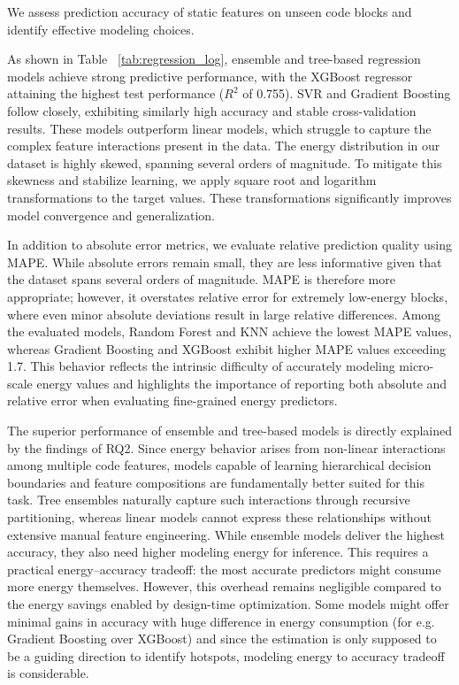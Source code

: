 
We assess prediction accuracy of static features on unseen code blocks and identify effective modeling choices.

As shown in Table ~\ref{tab:regression_log}, ensemble and tree-based regression models achieve strong predictive performance, with the XGBoost regressor attaining the highest test performance ($R^2$ of 0.755). SVR and Gradient Boosting follow closely, exhibiting similarly high accuracy and stable cross-validation results. These models outperform linear models, which struggle to capture the complex feature interactions present in the data. The energy distribution in our dataset is highly skewed, spanning several orders of magnitude. To mitigate this skewness and stabilize learning, we apply square root and logarithm transformations to the target values. These transformations significantly improves model convergence and generalization.

In addition to absolute error metrics, we evaluate relative prediction quality using MAPE. While absolute errors remain small, they are less informative given that the dataset spans several orders of magnitude. MAPE is therefore more appropriate; however, it overstates relative error for extremely low-energy blocks, where even minor absolute deviations result in large relative differences. Among the evaluated models, Random Forest and KNN achieve the lowest MAPE values, whereas Gradient Boosting and XGBoost exhibit higher MAPE values exceeding 1.7. This behavior reflects the intrinsic difficulty of accurately modeling micro-scale energy values and highlights the importance of reporting both absolute and relative error when evaluating fine-grained energy predictors.

The superior performance of ensemble and tree-based models is directly explained by the findings of RQ2. Since energy behavior arises from non-linear interactions among multiple code features, models capable of learning hierarchical decision boundaries and feature compositions are fundamentally better suited for this task. Tree ensembles naturally capture such interactions through recursive partitioning, whereas linear models cannot express these relationships without extensive manual feature engineering.
While ensemble models deliver the highest accuracy, they also need higher modeling energy for inference. This requires a practical energy–accuracy tradeoff: the most accurate predictors might consume more energy themselves. However, this overhead remains negligible compared to the energy savings enabled by design-time optimization. Some models might offer minimal gains in accuracy with huge difference in energy consumption (for e.g. Gradient Boosting over XGBoost) and since the estimation is only supposed to be a guiding direction to identify hotspots, modeling energy to accuracy tradeoff is considerable. 

